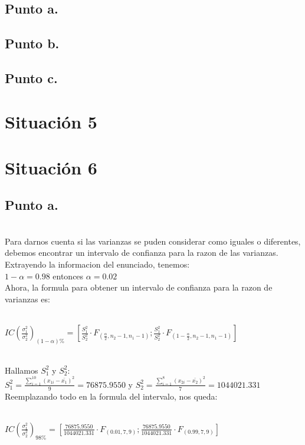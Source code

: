 \documentclass[letterpaper,12pt,onecolumn,titlepage]{article}
\begin{document}
\subsection{Punto a.}
\subsection{Punto b.}
\subsection{Punto c.}

\pagebreak\section{Situaci\'{o}n 5}



\pagebreak\section{Situaci\'{o}n 6}
\subsection{Punto a.}
~\\ Para darnos cuenta si las varianzas se puden considerar como iguales o diferentes, debemos encontrar un intervalo de confianza para la razon de las varianzas.
~\\ Extrayendo la informacion del enunciado, tenemos:
~\\ $1-\alpha=0.98$ entonces $\alpha=0.02$
~\\ Ahora, la formula para obtener un intervalo de confianza para la razon de varianzas es:

~\\ $IC(\frac{\sigma_1^{2}}{\sigma_2^{2}})_{(1-\alpha)\%}=\left[\frac{S_{1} ^{2}}{S_{2} ^{2}}\cdot F_{(\frac{\alpha}{2},n_{2}-1,n_{1}-1)}  ; \frac{S_{1} ^{2}}{S_{2} ^{2}}\cdot F_{(1-\frac{\alpha}{2},n_{2}-1,n_{1}-1)} \right]$

~\\ Hallamos $S_{1}^2$ y $S_{2}^2$:
~\\ $S_{1}^2=\frac{\sum\limits_{i=1}^{10}(x_{1i}-\bar{x_1})^2}{9}=76875.9550$ y $S_{2}^2=\frac{\sum\limits_{i=1}^{8}(x_{2i}-\bar{x_2})^2}{7}=1044021.331$
~\\ Reemplazando todo en la formula del intervalo, nos queda:

~\\ $IC(\frac{\sigma_1^{2}}{\sigma_2^{2}})_{98\%}=\left[\frac{76875.9550}{1044021.331}\cdot F_{(0.01,7,9)}  ; \frac{76875.9550}{1044021.331}\cdot F_{(0.99,7,9)} \right]$
\end{document}
